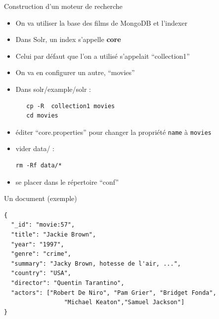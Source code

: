 
\begin{frame}[fragile]{Construction d'un moteur de recherche}
  \begin{itemize}
    \item On va utiliser la base des films de MongoDB et l'indexer
    \item Dans Solr, un index s'appelle {\bf core}
    \item Celui par défaut que l'on a utilisé s'appelait ``collection1''
    \item On va en configurer un autre, ``movies''
  \end{itemize}
  \begin{itemize}
    \item Dans solr/example/solr :\\
\begin{verbatim}
   cp -R  collection1 movies
   cd movies
\end{verbatim}
\item éditer ``core.properties'' pour changer 
la propriété \texttt{name} à \texttt{movies}
\item vider data/ :\\
  \begin{verbatim}                                              
rm -Rf data/*
\end{verbatim} 
     \item se placer dans le répertoire ``conf''
  \end{itemize}
\end{frame}
       


\begin{frame}[fragile]{Un document (exemple)}
  \begin{verbatim}
{
  "_id": "movie:57",
  "title": "Jackie Brown",
  "year": "1997",
  "genre": "crime",
  "summary": "Jacky Brown, hotesse de l'air, ...",
  "country": "USA",
  "director": "Quentin Tarantino",
  "actors": ["Robert De Niro", "Pam Grier", "Bridget Fonda",
                 "Michael Keaton","Samuel Jackson"]
}
\end{verbatim} 
\end{frame}

